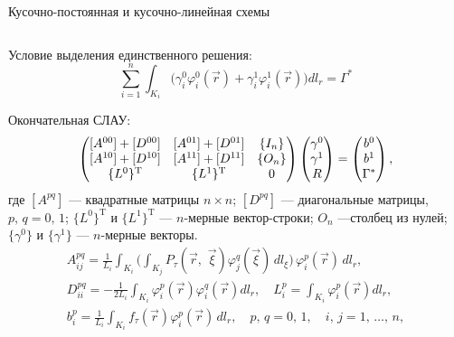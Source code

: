 \documentclass[ignoreonframetext,unicode]{beamer}
\begin{document}
\begin{frame}{Кусочно-постоянная и кусочно-линейная схемы}
\begin{columns}
\begin{column}{0.55\textwidth}
		\end{column}	
	\end{columns}
		Условие выделения единственного решения:\vspace*{-1.5mm}
		\[
		\sum_{i=1}^n \int_{K_i}\bigl(\gamma_i^0 \varphi_i^0(\vec r) + \gamma_i^1 \varphi_i^1(\vec r) \bigr) dl_r = \Gamma^\ast
		\]
\end{frame}

\begin{frame}
	Окончательная СЛАУ:
	\begin{equation*}
	\label{sys1}
	\begin{pmatrix}
	[A^{00}] + [D^{00}] & [A^{01}] + [D^{01}] & \{I_n\} \\
	[A^{10}] + [D^{10}] & [A^{11}] + [D^{11}] & \{O_n\}\\
	\{L^0\}^{\mathrm{T}} & \{L^1\}^{\mathrm{T}} & 0
	\end{pmatrix}
	\left(
	\begin{array}{@{}c@{}}
	\gamma^0\\
	\gamma^1\\
	R
	\end{array}
	\right)
	=
	\left(
	\begin{array}{@{}c@{}}
	b^0 \\
	b^1\\
	\Gamma^\ast
	\end{array}
	\right),
	\end{equation*}
	где $[A^{pq}]$ --- квадратные матрицы $n\times n$; $[D^{pq}]$ --- диагональные матрицы, $p,\,q = 0,\,1$; $\{L^0\}^{\mathrm{T}}$ и $\{L^1\}^{\mathrm{T}}$ --- $n$-мерные вектор-строки; $O_n$ ---столбец из нулей; $\{\gamma^0\}$ и $\{\gamma^1\}$ --- $n$-мерные векторы.
	\begin{gather*}
	A_{ij}^{pq} =\frac{1}{L_i}\int _{K_{i} }\biggl(\int _{K_{j} }P_\tau(\vec{r},\, \, \vec{\xi })\varphi _{j}^{q} (\vec{\xi })\, dl_{\xi }  \biggr) \, \varphi _{i}^{p} (\vec{r})\, dl_{r} ,\\[4mm]
	D_{ii}^{pq} = -\frac 1{2L_i} \int_{K_i}\varphi_{i}^{p}(\vec r) \varphi_{i}^{q}(\vec r) dl_r, \quad L_i^p = \int_{K_i} \varphi_{i}^{p}(\vec r) dl_r, \\[4mm]
	b_{i}^{p} =\frac{1}{L_i}\int_{K_i}f_\tau(\vec{r}) \varphi_{i}^{p} (\vec{r})\, dl_{r} , \quad    p,\, q=0,\, 1,\quad   i,\, j=1,\,\ldots, \, n,
	\end{gather*}
\end{frame}
\end{document}
